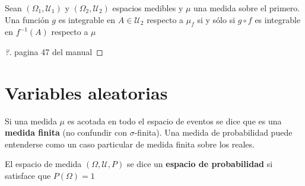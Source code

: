 \begin{definicion}
Sean $(\Omega_1,\mathcal{U}_1)$ y $(\Omega_2,\mathcal{U}_2)$ espacios medibles y $\mu$ una medida sobre el primero. Una función $g$ es integrable en $A \in \mathcal{U_2}$ respecto a $\mu_f$ si y sólo si $g \circ f$ es integrable en $f^{-1}(A)$ respecto a $\mu$
\end{definicion}
\begin{proof}
[?] pagina 47 del manual
\end{proof}

%



\section{Variables aleatorias}

Si una medida $\mu$ es acotada en todo el espacio de eventos se dice que es una \textbf{medida finita} (no confundir con $\sigma$-finita). 
%
Una medida de probabilidad puede entenderse como un caso particular de medida finita sobre los reales.

\begin{definicion}
El espacio de medida $(\Omega,\mathcal{U},P)$ se dice un \textbf{espacio de probabilidad} si satisface que $P(\Omega) = 1$ 
\end{definicion}

